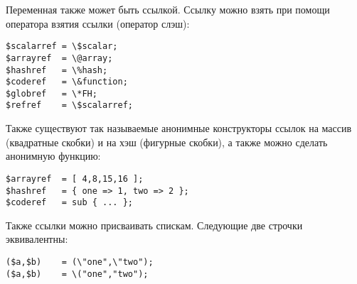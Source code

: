 Переменная также может быть ссылкой. Ссылку можно взять при помощи оператора взятия ссылки (оператор слэш):
\begin{verbatim}
$scalarref = \$scalar;
$arrayref  = \@array;
$hashref   = \%hash;
$coderef   = \&function;
$globref   = \*FH;
$refref    = \$scalarref;
\end{verbatim}
Также существуют так называемые анонимные конструкторы ссылок на массив (квадратные скобки) и на хэш (фигурные скобки), а также можно сделать анонимную функцию:
\begin{verbatim}
$arrayref  = [ 4,8,15,16 ];
$hashref   = { one => 1, two => 2 };
$coderef   = sub { ... };
\end{verbatim}
Также ссылки можно присваивать спискам. Следующие две строчки эквивалентны:
\begin{verbatim}
($a,$b)    = (\"one",\"two");
($a,$b)    = \("one","two");
\end{verbatim}

